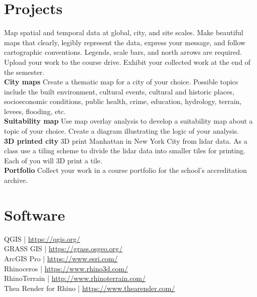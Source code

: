 \documentclass[11pt,article,oneside]{memoir}
\begin{document}
\section{Projects}
Map spatial and temporal data
at global, city, and site scales.
Make beautiful maps that 
clearly, legibly represent the data,
express your message, and
follow cartographic conventions.
Legends, scale bars, and north arrows are required.
Upload your work to the course drive.
Exhibit your collected work at the end of the semester.\\

\noindent \textbf{City maps}
Create a thematic map for a city of your choice. 
Possible topics include the built environment, 
cultural events, cultural and historic places, 
socioeconomic conditions, public health, crime, education, 
hydrology, terrain, levees, flooding, etc.\\

\noindent \textbf{Suitability map}
Use map overlay analysis 
to develop a suitability map
about a topic of your choice.
Create a diagram illustrating 
the logic of your analysis.\\

\noindent \textbf{3D printed city}
3D print Manhattan in New York City from lidar data. 
As a class use a tiling scheme 
to divide the lidar data into smaller tiles for printing.
Each of you will 3D print a tile.\\

\noindent \textbf{Portfolio}
Collect your work in a course portfolio 
for the school's accreditation archive.\\

\clearpage

\section{Software}
\begin{multicols}{2}
\raggedright
QGIS | \url{https://qgis.org/}\\
GRASS GIS | \url{https://grass.osgeo.org/}\\
ArcGIS Pro | \url{https://www.esri.com/}\\
Rhinoceros | \url{https://www.rhino3d.com/}\\
RhinoTerrain | \url{http://www.rhinoterrain.com/}\\
Thea Render for Rhino | \url{https://www.thearender.com/}\\
\end{multicols}
\end{document}
